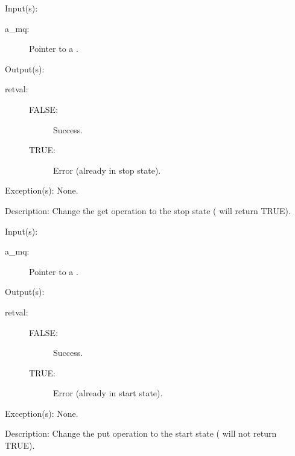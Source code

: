 \begin{capi}
\begin{capilist}
	\item[Input(s): ]
		\begin{description}\item[]
		\item[a\_mq: ]
			Pointer to a .
		\end{description}
	\item[Output(s): ]
		\begin{description}\item[]
		\item[retval: ]
			\begin{description}\item[]
			\item[FALSE: ] Success.
			\item[TRUE: ] Error (already in stop state).
			\end{description}
		\end{description}
	\item[Exception(s): ] None.
	\item[Description: ]
		Change the get operation to the stop state
		( will return TRUE).
	\end{capilist}
\label{mq_put_start}
	\begin{capilist}
	\item[Input(s): ]
		\begin{description}\item[]
		\item[a\_mq: ]
			Pointer to a .
		\end{description}
	\item[Output(s): ]
		\begin{description}\item[]
		\item[retval: ]
			\begin{description}\item[]
			\item[FALSE: ] Success.
			\item[TRUE: ] Error (already in start state).
			\end{description}
		\end{description}
	\item[Exception(s): ] None.
	\item[Description: ]
		Change the put operation to the start state
		( will not return TRUE).
	\end{capilist}
\label{mq_put_stop}

\end{capi}
